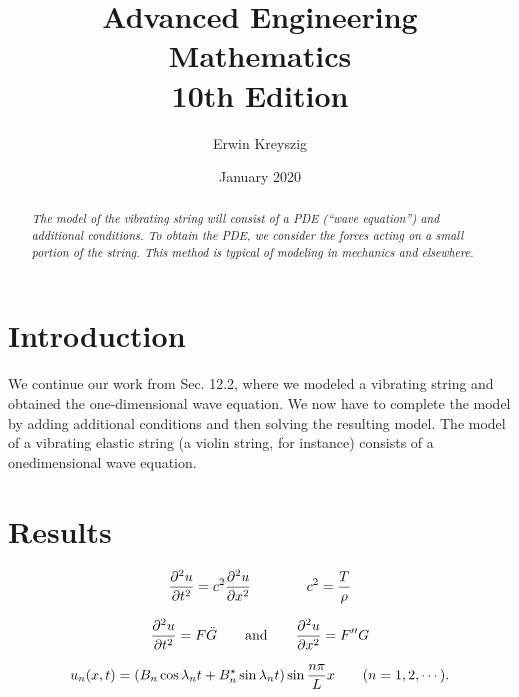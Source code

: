 \documentclass[12pt, a4paper, leqno]{amsart}
\begin{document}
\title{Advanced Engineering Mathematics\\
    10th Edition}
\author{Erwin Kreyszig}
\date{January 2020}


\begin{abstract}
\textit{The model of the vibrating string will consist of a PDE 
(“wave equation”) and 
additional conditions. To obtain the PDE, we consider the forces acting on a 
small portion of the string. This method is typical of modeling in 
mechanics and elsewhere.}
\end{abstract}

\maketitle
\tableofcontents

\section{Introduction}

We continue our work from Sec. 12.2, where we modeled a vibrating string and obtained
the one-dimensional wave equation. We now have to complete the model by adding
additional conditions and then solving the resulting model.
The model of a vibrating elastic string (a violin string, for instance)
consists of a onedimensional wave equation.

\section{Results}

\begin{equation}
    \frac{\partial^2{u}}{\partial{t^2}} = c^2\frac{\partial^2{u} \\
    }{\partial{x^2}} \qquad \qquad c^2 = \frac{T}{\rho}
\end{equation}

\begin{equation}
    \frac{ \partial^2{u} }{ \partial{t^2} } = F\ddot{G} \qquad \text{and} \\
    \qquad \frac{ \partial^2{u} }{ \partial{x^2} } = F''G
\end{equation}

\begin{equation}
    u_n(x,t)=(B_n\cos{\lambda_n t} + B_n^\star\sin{\lambda_n t}) \\
    \sin{\frac{n\pi}{L} x} \quad \quad (n=1,2,\dotsb).
\end{equation}
\end{document}
